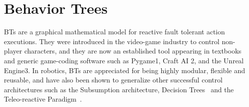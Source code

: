 \section{Behavior Trees}
\label{sec:trees}


BTs are a graphical mathematical model for reactive fault tolerant action executions. They were introduced in the video-game industry to control non-player characters, and they are now an established tool appearing in textbooks \cite{millington2009artificial,rabin2014gameAiPro} and generic game-coding software such as Pygame1, Craft AI 2, and the Unreal Engine3. In robotics, BTs are appreciated for being highly modular, flexible and reusable, and have also been shown to generalize other successful control architectures such as the Subsumption architecture, Decision Trees~\cite{colledachise17tro} and the Teleo-reactive Paradigm~\cite{Colledanchise16iros}.
% 
%
%
